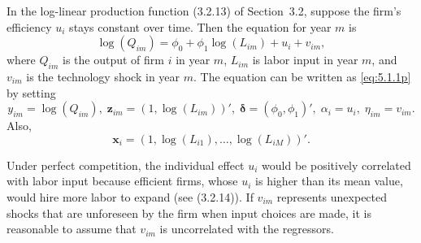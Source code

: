 \begin{example}
\label{ex:5.1}
In the log-linear production function (3.2.13) of Section~3.2, suppose the firm's
efficiency $u_i$ stays constant over time. Then the equation for year $m$ is
\[
  \log(Q_{im}) = \phi_0 + \phi_1 \log(L_{im}) + u_i + v_{im},
\]
where $Q_{im}$ is the output of firm $i$ in year $m$, $L_{im}$ is labor input in year $m$, and
$v_{im}$ is the technology shock in year $m$. The equation can be written as \eqref{eq:5.1.1p}
by setting
\[
  y_{im} = \log(Q_{im}),\;
  \mathbf{z}_{im} = (1, \log(L_{im}))',\;
  \boldsymbol{\delta} = (\phi_0, \phi_1)',\;
  \alpha_i = u_i,\;
  \eta_{im} = v_{im}.
\]
Also,
\[
  \mathbf{x}_i = (1, \log(L_{i1}), \ldots, \log(L_{iM}))'.
\]

Under perfect competition, the individual effect $u_i$ would be positively correlated
with labor input because efficient firms, whose $u_i$ is higher than its
mean value, would hire more labor to expand (see (3.2.14)). If $v_{im}$ represents
unexpected shocks that are unforeseen by the firm when input choices are
made, it is reasonable to assume that $v_{im}$ is uncorrelated with the regressors.
\end{example}

